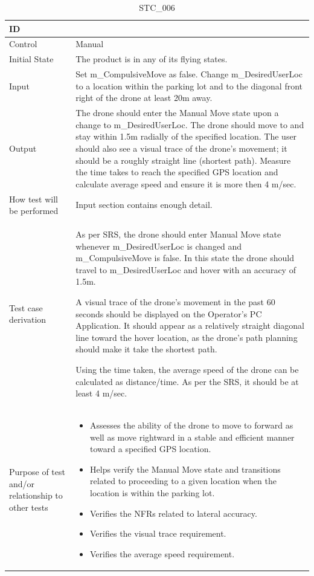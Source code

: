 \documentclass[12pt, titlepage]{article}
\begin{document}
\begin{table}[!h]
\begin{center}
\caption {STC\_006}
\label{tab:STC_006}
\begin{tabular}{ | m{3.2cm} | m{12.2cm} | } 
\hline
ID & \nameref{tab:STC_006} \\ 
\hline
Control & Manual \\ 
\hline
Initial State & The product is in any of its flying states.   \\ 
\hline
Input & Set m\_CompulsiveMove as false. Change m\_DesiredUserLoc to a location within the parking lot and to the diagonal front right of the drone at least 20m away.  \\ 
\hline
Output & The drone should enter the Manual Move state upon a change to m\_DesiredUserLoc. The drone should move to and stay within 1.5m radially of the specified location. 
The user should also see a visual trace of the drone's movement; it should be a roughly straight line (shortest path).
Measure the time takes to reach the specified GPS location and calculate average speed and ensure it is more then 4 m/sec.  \\ 
\hline
How test will be performed & Input section contains enough detail. \\ 
\hline
Test case derivation & As per SRS, the drone should enter Manual Move state whenever m\_DesiredUserLoc is changed and m\_CompulsiveMove is false. In this state the drone should travel to m\_DesiredUserLoc and hover with an accuracy of 1.5m. 

A visual trace of the drone's movement in the past 60 seconds should be displayed on the Operator's PC Application. It should appear as a relatively straight diagonal line toward the hover location, as the drone's path planning should make it take the shortest path. 

Using the time taken, the average speed of the drone can be calculated as distance/time. As per the SRS, it should be at least 4 m/sec. 
 \\ 
\hline
Purpose of test and/or relationship to other tests & 
\begin{itemize}
    \item Assesses the ability of the drone to move to forward as well as move rightward in a stable and efficient manner toward a specified GPS location.
    \item Helps verify the Manual Move state and transitions related to proceeding to a given location when the location is within the parking lot.
    \item Verifies the NFRs related to lateral accuracy. 
    \item Verifies the visual trace requirement. 
    \item Verifies the average speed requirement. 
\end{itemize}
\\ 
\hline
\end{tabular}
\end{center}
\end{table}
\end{document}
